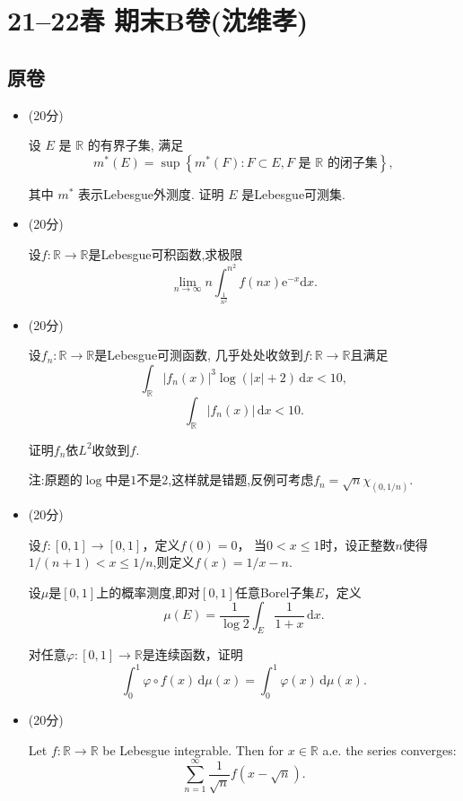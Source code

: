 \section{21--22春 期末B卷(沈维孝)}

\subsection{原卷}
\begin{itemize}
\item[一、](20分)

设 $E$ 是 $\mathbb{R}$ 的有界子集, 满足
$$
m^*(E)=\sup \left\{m^*(F): F \subset E, F \text { 是 } \mathbb{R} \text { 的闭子集}\right\},
$$

其中 $m^*$ 表示Lebesgue外测度. 证明 $E$ 是Lebesgue可测集.

\item[二、](20分)

设$ f\colon\mathbb{R} \to \mathbb{R}  $是Lebesgue可积函数,求极限
$$
\lim_{n\rightarrow \infty}n\int_{\frac{1}{n^2}}^{n^2}{f( nx ) \text{e}^{-x}\text{d}x}.
$$

\item[三、](20分)

设$ f_{n}\colon\mathbb{R} \to \mathbb{R}  $是Lebesgue可测函数,
几乎处处收敛到$ f\colon\mathbb{R} \to \mathbb{R} $且满足
$$\int_{\mathbb{R}}{|f_n(x)|^3\log (|x|+2)\,\text{d}x}<10,$$
$$\int_{\mathbb{R}}{|f_n(x)|\,\text{d}x}<10.$$

证明$ f_{n} $依$ L^{2} $收敛到$ f $.

注:原题的$ \log $中是$ 1 $不是$ 2 $,这样就是错题,反例可考虑$ f_{n}=\sqrt{n}\chi_{(0,1/n)} $.

\item[四、](20分)

设$ f\colon[0,1]\to [0,1] $，定义$ f(0)=0 $，
当$ 0<x\le 1 $时，设正整数$ n $使得$ 1/(n+1)<x\le 1/n $,则定义$ f(x)=1/x-n $.

设$ \mu $是$ [0,1] $上的概率测度,即对$ [0,1] $任意Borel子集$ E $，定义
$$\mu(E) =\frac{1}{\log 2}\int_E\frac{1}{1+x}\,\text{d}x.$$

对任意$ \varphi\colon[0,1]\to \mathbb{R}  $是连续函数，证明
$$\int_0^1{\varphi \circ f(x) \,\text{d}\mu(x)}
=\int_0^1{\varphi (x) \,\text{d}\mu(x)}.$$

\item[五、](20分)

Let $ f\colon\mathbb{R} \to \mathbb{R}  $ be Lebesgue integrable. 
Then for $ x\in \mathbb{R}  $ a.e. the series converges:
$$
\sum_{n=1}^{\infty}{\frac{1}{\sqrt{n}}f( x-\sqrt{n} )}.
$$

\end{itemize}

